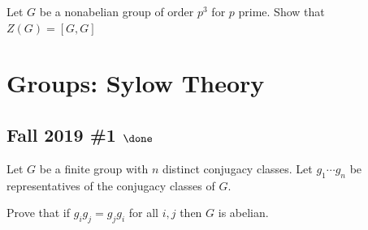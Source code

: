 Let \(G\) be a nonabelian group of order \(p^3\) for \(p\) prime. Show
that \(Z(G) = [G, G]\)

\hypertarget{groups-sylow-theory}{%
\section{Groups: Sylow Theory}\label{groups-sylow-theory}}

\hypertarget{fall-2019-1-done}{%
\subsection{\texorpdfstring{Fall 2019 \#1
\(\done\)}{Fall 2019 \#1 \textbackslash done}}\label{fall-2019-1-done}}

Let \(G\) be a finite group with \(n\) distinct conjugacy classes. Let
\(g_1 \cdots g_n\) be representatives of the conjugacy classes of \(G\).

Prove that if \(g_i g_j = g_j g_i\) for all \(i, j\) then \(G\) is
abelian.


